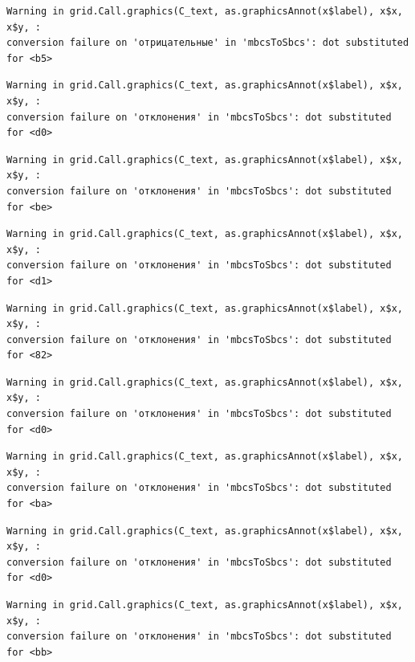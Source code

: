 \documentclass[
  letterpaper,
]{scrbook}
\theoremstyle{definition}
\theoremstyle{remark}
\begin{document}
\begin{verbatim}
Warning in grid.Call.graphics(C_text, as.graphicsAnnot(x$label), x$x, x$y, :
conversion failure on 'отрицательные' in 'mbcsToSbcs': dot substituted for <b5>
\end{verbatim}

\begin{verbatim}
Warning in grid.Call.graphics(C_text, as.graphicsAnnot(x$label), x$x, x$y, :
conversion failure on 'отклонения' in 'mbcsToSbcs': dot substituted for <d0>
\end{verbatim}

\begin{verbatim}
Warning in grid.Call.graphics(C_text, as.graphicsAnnot(x$label), x$x, x$y, :
conversion failure on 'отклонения' in 'mbcsToSbcs': dot substituted for <be>
\end{verbatim}

\begin{verbatim}
Warning in grid.Call.graphics(C_text, as.graphicsAnnot(x$label), x$x, x$y, :
conversion failure on 'отклонения' in 'mbcsToSbcs': dot substituted for <d1>
\end{verbatim}

\begin{verbatim}
Warning in grid.Call.graphics(C_text, as.graphicsAnnot(x$label), x$x, x$y, :
conversion failure on 'отклонения' in 'mbcsToSbcs': dot substituted for <82>
\end{verbatim}

\begin{verbatim}
Warning in grid.Call.graphics(C_text, as.graphicsAnnot(x$label), x$x, x$y, :
conversion failure on 'отклонения' in 'mbcsToSbcs': dot substituted for <d0>
\end{verbatim}

\begin{verbatim}
Warning in grid.Call.graphics(C_text, as.graphicsAnnot(x$label), x$x, x$y, :
conversion failure on 'отклонения' in 'mbcsToSbcs': dot substituted for <ba>
\end{verbatim}

\begin{verbatim}
Warning in grid.Call.graphics(C_text, as.graphicsAnnot(x$label), x$x, x$y, :
conversion failure on 'отклонения' in 'mbcsToSbcs': dot substituted for <d0>
\end{verbatim}

\begin{verbatim}
Warning in grid.Call.graphics(C_text, as.graphicsAnnot(x$label), x$x, x$y, :
conversion failure on 'отклонения' in 'mbcsToSbcs': dot substituted for <bb>
\end{verbatim}
\end{document}
